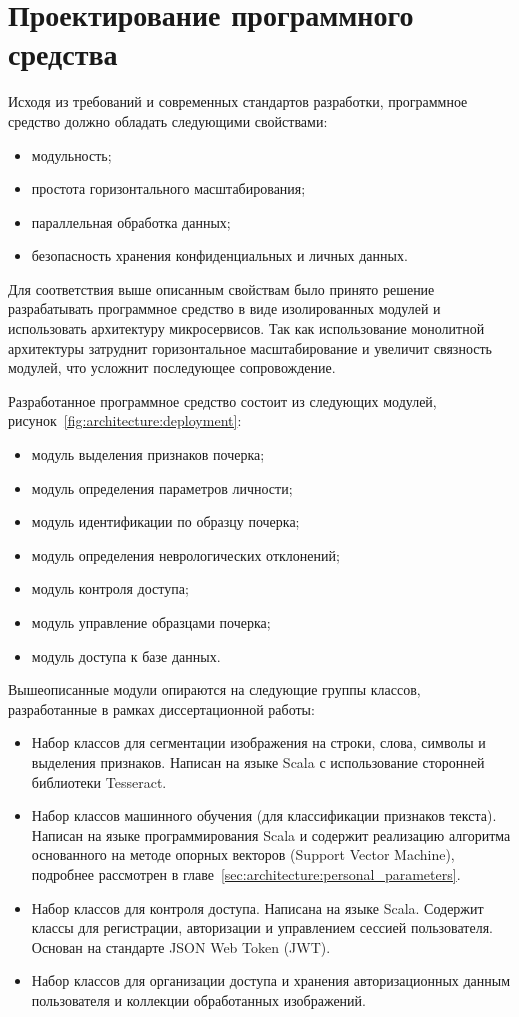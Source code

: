\section{Проектирование программного средства}

Исходя из требований и современных стандартов разработки, программное средство должно обладать следующими свойствами:
\begin{itemize}
    \item модульность;
    \item простота горизонтального масштабирования;
    \item параллельная обработка данных;
    \item безопасность хранения конфиденциальных и личных данных.
\end{itemize}

Для соответствия выше описанным свойствам было принято решение разрабатывать программное средство в виде изолированных модулей и использовать архитектуру микросервисов. Так как использование монолитной архитектуры затруднит горизонтальное масштабирование и увеличит связность модулей, что усложнит последующее сопровождение. 

Разработанное программное средство состоит из следующих модулей, рисунок~\ref{fig:architecture:deployment}:
\begin{itemize}
    \item модуль выделения признаков почерка;
    \item модуль определения параметров личности;
    \item модуль идентификации по образцу почерка;
    \item модуль определения неврологических отклонений;
    \item модуль контроля доступа;
    \item модуль управление образцами почерка;
    \item модуль доступа к базе данных.
\end{itemize}

Вышеописанные модули опираются на следующие группы классов, разработанные в рамках диссертационной работы:
\begin{itemize}
    \item Набор классов для сегментации изображения на строки, слова, символы и выделения признаков. Написан на языке Scala с использование сторонней библиотеки Tesseract.
    \item Набор классов машинного обучения (для классификации признаков текста). Написан на языке программирования Scala и содержит реализацию алгоритма основанного на методе опорных векторов (Support Vector Machine), подробнее рассмотрен в главе~\ref{sec:architecture:personal_parameters}.
    \item Набор классов для контроля доступа. Написана на языке Scala. Содержит классы для регистрации, авторизации и управлением сессией пользователя. Основан на стандарте JSON Web Token (JWT).
    \item Набор классов для организации доступа и хранения авторизационных данным пользователя и коллекции обработанных изображений.
\end{itemize}

